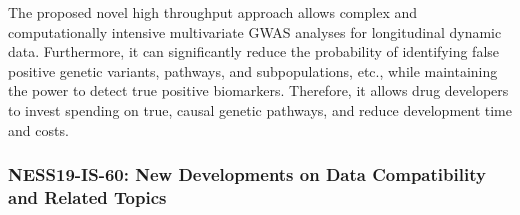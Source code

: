 \begin{itemize}
The proposed novel high throughput approach allows complex and computationally intensive multivariate GWAS analyses for longitudinal dynamic data. Furthermore, it can significantly reduce the probability of identifying false positive genetic variants, pathways, and subpopulations, etc., while maintaining the power to detect true positive biomarkers. Therefore, it allows drug developers to invest spending on true, causal genetic pathways, and reduce development time and costs.

\end{itemize}

\subsubsection*{NESS19-IS-60: New Developments on Data Compatibility and Related  Topics}

